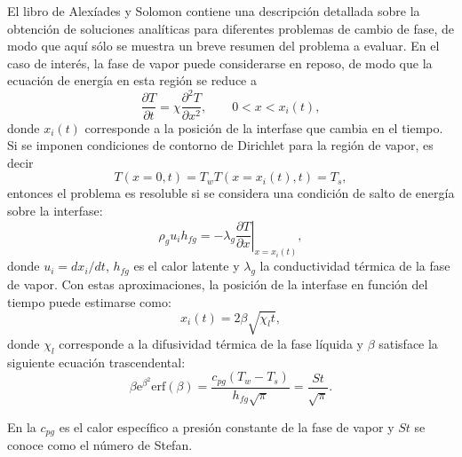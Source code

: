 El libro de Alex\'iades y Solomon \cite{alexiades_mathematical_1993} contiene una descripci\'on detallada sobre la obtenci\'on de soluciones anal\'iticas para diferentes problemas de cambio de fase, de modo que aqu\'i s\'olo se muestra un breve resumen del problema a evaluar. En el caso de inter\'es, la fase de vapor puede considerarse en reposo, de modo que la ecuaci\'on de energ\'ia en esta regi\'on se reduce a 
\begin{equation}
	\dfrac{\partial T}{\partial t} = \chi \dfrac{\partial^2 T}{\partial x^2}, \qquad 0 < x < x_i(t),
\end{equation}
donde $x_i(t)$ corresponde a la posici\'on de la interfase que cambia en el tiempo. Si se imponen condiciones de contorno de Dirichlet para la regi\'on de vapor, es decir
\begin{subequations}
	\begin{equation}
		T(x=0,t) = T_w
	\end{equation}
	\begin{equation}
		T(x=x_i(t),t) = T_s,
	\end{equation}	
\end{subequations}
entonces el problema es resoluble si se considera una condici\'on de salto de energ\'ia sobre la interfase:
\begin{equation}
	\rho_g u_i h_{fg} = -\lambda_g \left.\dfrac{\partial T}{\partial x} \right|_{x=x_i(t)},
\end{equation}
donde $u_i=dx_i/dt$, $h_{fg}$ es el calor latente y $\lambda_g$ la conductividad t\'ermica de la fase de vapor. Con estas aproximaciones, la posici\'on de la interfase en funci\'on del tiempo puede estimarse como:
\begin{equation}
	x_i(t)=2\beta \sqrt{\chi_lt},
	\label{eq:stefan_int}
\end{equation}
donde $\chi_l$ corresponde a la difusividad t\'ermica de la fase l\'iquida y $\beta$ satisface la siguiente ecuaci\'on trascendental:
\begin{equation}
	\beta \mbox{e}^{\beta^2}\mbox{erf}(\beta)=\dfrac{c_{pg}(T_w-T_s)}{h_{fg}\sqrt{\pi}} = \dfrac{St}{\sqrt{\pi}}.
	\label{eq:stefan_beta}
\end{equation}

En la  $c_{pg}$ es el calor espec\'ifico a presi\'on constante de la fase de vapor y $St$ se conoce como el n\'umero de Stefan. 

